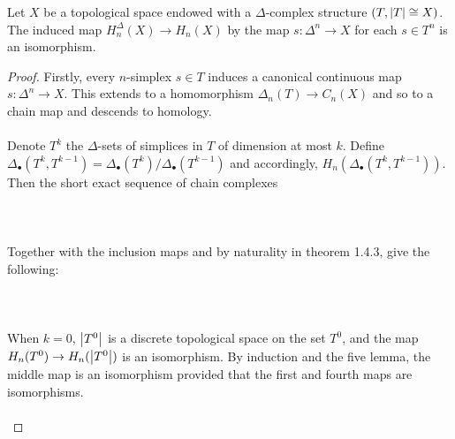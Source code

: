 \documentclass[a4paper]{article}
\begin{document}
\begin{thm}{}{} Let $X$ be a topological space endowed with a $\Delta$-complex structure $(T,\abs{T}\cong X)$. The induced map $H_n^\Delta(X)\to H_n(X)$ by the map $s:\Delta^n\to X$ for each $s\in T^n$ is an isomorphism. \tcbline
\begin{proof}
Firstly, every $n$-simplex $s\in T$ induces a canonical continuous map $s:\Delta^n\to X$. This extends to a homomorphism $\Delta_n(T)\to C_n(X)$ and so to a chain map and descends to homology. \\~\\

Denote $T^k$ the $\Delta$-sets of simplices in $T$ of dimension at most $k$. Define $\Delta_\bullet(T^k,T^{k-1})=\Delta_\bullet(T^k)/\Delta_\bullet(T^{k-1})$ and accordingly, $H_n(\Delta_\bullet(T^k,T^{k-1}))$. Then the short exact sequence of chain complexes \\~\\
 \\~\\
Together with the inclusion maps and by naturality in theorem 1.4.3, give the following: \\~\\
 \\~\\
When $k=0$, $\abs{T^0}$ is a discrete topological space on the set $T^0$, and the map $H_n(T^0)\to H_n(\abs{T^0})$ is an isomorphism. By induction and the five lemma, the middle map is an isomorphism provided that the first and fourth maps are isomorphisms. \\~\\


\end{proof}
\end{thm}
\end{document}
